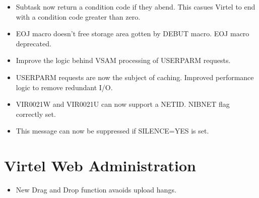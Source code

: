 \documentclass[letterpaper,10pt,english]{sphinxmanual}
\begin{document}
\begin{itemize}
\item {} 
Subtask now return a condition code if they abend. This casues Virtel to end with a condition code greater than zero.

\end{itemize}

\begin{itemize}
\item {} 
EOJ macro doesn’t free storage area gotten by DEBUT macro. EOJ macro deprecated.

\end{itemize}

\begin{itemize}
\item {} 
Improve the logic behind VSAM processing of USERPARM requests.

\end{itemize}

\begin{itemize}
\item {} 
USERPARM requests are now the subject of caching. Improved performance logic to remove redundant I/O.

\end{itemize}

\begin{itemize}
\item {} 
VIR0021W and VIR0021U can now support a NETID. NIBNET flag correctly set.

\end{itemize}

\begin{itemize}
\item {} 
This message can now be suppressed if SILENCE=YES is set.

\end{itemize}

\newpage


\section{Virtel Web Administration}
\label{\detokenize{TN201902:virtel-web-administration}}
\begin{itemize}
\item {} 
New Drag and Drop function avaoids upload hangs.

\end{itemize}
\end{document}
